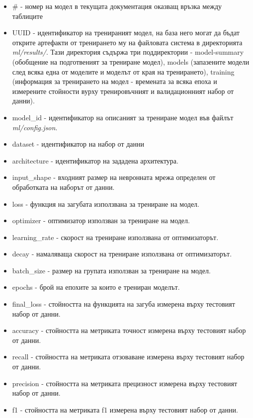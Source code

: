 \documentclass{article}
\begin{document}
\begin{itemize}
  \item \# - номер на модел в текущата документация оказващ връзка между таблиците
  \item UUID - идентификатор на тренираният модел, на база него могат да бъдат открите артефакти от тренирането му на
  файловата система в директорията \textit{ml/results/}. Тази директория съдържа три поддиректории - model-summary
  (обобщение на подготвеният за трениране модел), models (запазените модели след всяка една от моделите и моделът от
  края на тренирането), training (информация за тренирането на модел - времената за всяка епоха и измерените стойности
  вурху тренировъчният и валидационният набор от данни).
  \item model\_id - идентификатор на описаният за трениране модел във файлът \textit{ml/config.json}.
  \item dataset - идентификатор на набор от данни
  \item architecture - идентификатор на зададена архитектура.
  \item input\_shape - входният размер на невронната мрежа определен от обработката на наборът от данни.
  \item loss - функция на загубата използвана за трениране на модел.
  \item optimizer - оптимизатор използван за трениране на модел.
  \item learning\_rate - скорост на трениране използвана от оптимизаторът.
  \item decay - намаляваща скорост на трениране използвана от оптимизаторът.
  \item batch\_size - размер на групата използван за трениране на модел.
  \item epochs - брой на епохите за които е трениран моделът.
  \item final\_loss - стойността на функцията на загуба измерена върху тестовият набор от данни.
  \item accuracy - стойността на метриката точност измерена върху тестовият набор от данни.
  \item recall - стойността на метриката отзоваване измерена върху тестовият набор от данни.
  \item precision - стойността на метриката прецизност измерена върху тестовият набор от данни.
  \item f1 - стойността на метриката f1 измерена върху тестовият набор от данни.
\end{itemize}
\end{document}
